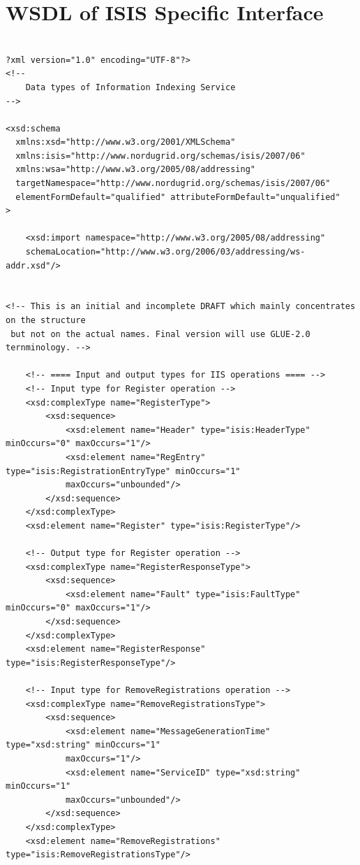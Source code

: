 \documentclass{book}
\begin{document}
\section{WSDL of ISIS Specific Interface}
\label{annex:isis_wsdl}
\begin{verbatim}

?xml version="1.0" encoding="UTF-8"?>
<!--
    Data types of Information Indexing Service
-->

<xsd:schema
  xmlns:xsd="http://www.w3.org/2001/XMLSchema"
  xmlns:isis="http://www.nordugrid.org/schemas/isis/2007/06"
  xmlns:wsa="http://www.w3.org/2005/08/addressing"
  targetNamespace="http://www.nordugrid.org/schemas/isis/2007/06"
  elementFormDefault="qualified" attributeFormDefault="unqualified"
>

    <xsd:import namespace="http://www.w3.org/2005/08/addressing" 
    schemaLocation="http://www.w3.org/2006/03/addressing/ws-addr.xsd"/>


<!-- This is an initial and incomplete DRAFT which mainly concentrates on the structure
 but not on the actual names. Final version will use GLUE-2.0 ternminology. -->

    <!-- ==== Input and output types for IIS operations ==== -->
    <!-- Input type for Register operation -->
    <xsd:complexType name="RegisterType">
        <xsd:sequence>
            <xsd:element name="Header" type="isis:HeaderType" minOccurs="0" maxOccurs="1"/>
            <xsd:element name="RegEntry" type="isis:RegistrationEntryType" minOccurs="1"
            maxOccurs="unbounded"/>
        </xsd:sequence>
    </xsd:complexType>
    <xsd:element name="Register" type="isis:RegisterType"/>

    <!-- Output type for Register operation -->
    <xsd:complexType name="RegisterResponseType">
        <xsd:sequence>
            <xsd:element name="Fault" type="isis:FaultType" minOccurs="0" maxOccurs="1"/>
        </xsd:sequence>
    </xsd:complexType>
    <xsd:element name="RegisterResponse" type="isis:RegisterResponseType"/>

    <!-- Input type for RemoveRegistrations operation -->
    <xsd:complexType name="RemoveRegistrationsType">
        <xsd:sequence>
            <xsd:element name="MessageGenerationTime" type="xsd:string" minOccurs="1" 
            maxOccurs="1"/>
            <xsd:element name="ServiceID" type="xsd:string" minOccurs="1" 
            maxOccurs="unbounded"/>
        </xsd:sequence>
    </xsd:complexType>
    <xsd:element name="RemoveRegistrations" type="isis:RemoveRegistrationsType"/>


\end{verbatim}
\end{document}
